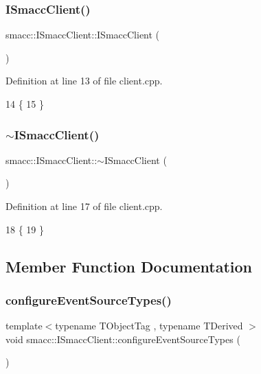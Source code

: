 \subsubsection{\texorpdfstring{I\+Smacc\+Client()}{ISmaccClient()}}
{\footnotesize\ttfamily smacc\+::\+I\+Smacc\+Client\+::\+I\+Smacc\+Client (\begin{DoxyParamCaption}{ }\end{DoxyParamCaption})}



Definition at line 13 of file client.\+cpp.


\begin{DoxyCode}
14 \{
15 \}
\end{DoxyCode}
\mbox{\label{classsmacc_1_1ISmaccClient_a030e17771bf2e404a6fad97273c4d7f4}} 
\subsubsection{\texorpdfstring{$\sim$\+I\+Smacc\+Client()}{~ISmaccClient()}}
{\footnotesize\ttfamily smacc\+::\+I\+Smacc\+Client\+::$\sim$\+I\+Smacc\+Client (\begin{DoxyParamCaption}{ }\end{DoxyParamCaption})\hspace{0.3cm}{\ttfamily [virtual]}}



Definition at line 17 of file client.\+cpp.


\begin{DoxyCode}
18 \{
19 \}
\end{DoxyCode}


\subsection{Member Function Documentation}
\mbox{\label{classsmacc_1_1ISmaccClient_a643285b93f2bd33987e0d0d1a12caf10}} 
\subsubsection{\texorpdfstring{configure\+Event\+Source\+Types()}{configureEventSourceTypes()}}
{\footnotesize\ttfamily template$<$typename T\+Object\+Tag , typename T\+Derived $>$ \\
void smacc\+::\+I\+Smacc\+Client\+::configure\+Event\+Source\+Types (\begin{DoxyParamCaption}{ }\end{DoxyParamCaption})\hspace{0.3cm}{\ttfamily [inline]}}



